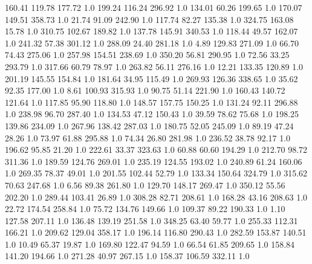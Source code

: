     160.41    119.78    177.72  1.0
    199.24    116.24    296.92  1.0
    134.01     60.26    199.65  1.0
    170.07    149.51    358.73  1.0
     21.74     91.09    242.90  1.0
    117.74     82.27    135.38  1.0
    324.75    163.08     15.78  1.0
    310.75    102.67    189.82  1.0
    137.78    145.91    340.53  1.0
    118.44     49.57    162.07  1.0
    241.32     57.38    301.12  1.0
    288.09     24.40    281.18  1.0
      4.89    129.83    271.09  1.0
     66.70     74.43    275.06  1.0
    257.98    154.51    238.69  1.0
    350.20     56.81    290.95  1.0
     72.56     33.25    293.79  1.0
    317.66     60.79     78.97  1.0
    263.82     56.11    276.16  1.0
     12.21    133.35    120.89  1.0
    201.19    145.55    154.84  1.0
    181.64     34.95    115.49  1.0
    269.93    126.36    338.65  1.0
     35.62     92.35    177.00  1.0
      8.61    100.93    315.93  1.0
     90.75     51.14    221.90  1.0
    160.43    140.72    121.64  1.0
    117.85     95.90    118.80  1.0
    148.57    157.75    150.25  1.0
    131.24     92.11    296.88  1.0
    238.98     96.70    287.40  1.0
    134.53     47.12    150.43  1.0
     39.59     78.62     75.68  1.0
    198.25    139.86    234.09  1.0
    267.96    138.42    287.03  1.0
    180.75     52.05    245.09  1.0
     89.19     47.24     28.26  1.0
     73.97     61.88    295.88  1.0
     74.34     26.80    281.98  1.0
    236.52     38.78     92.17  1.0
    196.62     95.85     21.20  1.0
    222.61     33.37    323.63  1.0
     60.88     60.60    194.29  1.0
    212.70     98.72    311.36  1.0
    189.59    124.76    269.01  1.0
    235.19    124.55    193.02  1.0
    240.89     61.24    160.06  1.0
    269.35     78.37     49.01  1.0
    201.55    102.44     52.79  1.0
    133.34    150.64    324.79  1.0
    315.62     70.63    247.68  1.0
      6.56     89.38    261.80  1.0
    129.70    148.17    269.47  1.0
    350.12     55.56    202.20  1.0
    289.44    103.41     26.89  1.0
    308.28     82.71    208.61  1.0
    168.28     43.16    208.63  1.0
     22.72    174.54    258.84  1.0
     75.72    134.76    149.66  1.0
    109.37     89.22    190.33  1.0
      1.10    127.58    207.11  1.0
    136.48    139.19    251.58  1.0
    348.25     63.40     59.77  1.0
    255.33    112.31    166.21  1.0
    209.62    129.04    358.17  1.0
    196.14    116.80    290.43  1.0
    282.59    153.87    140.51  1.0
     10.49     65.37     19.87  1.0
    169.80    122.47     94.59  1.0
     66.54     61.85    209.65  1.0
    158.84    141.20    194.66  1.0
    271.28     40.97    267.15  1.0
    158.37    106.59    332.11  1.0
